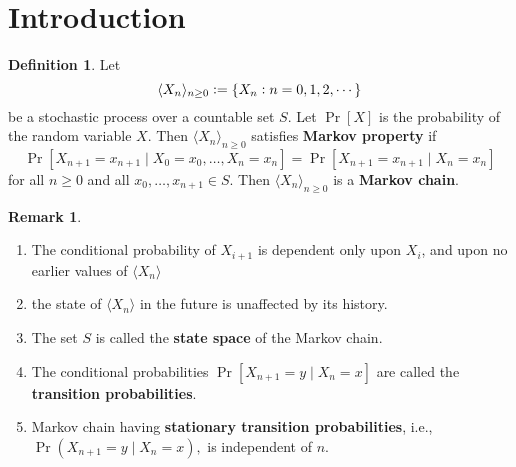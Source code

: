 \documentclass[12pt,openany]{book}
\theoremstyle{definition}
\newtheorem{definition}{Definition}[chapter]
\newtheorem{remark}{Remark}[chapter]
\newcommand{\ie}{\textnormal{i.e.}}
\newcommand{\markov}[1]{\langle #1\rangle}
\begin{document}
	\section{Introduction}
	\begin{tcolorbox}[colback=white,colframe=defcolor,arc=5pt,title={\color{white}\bf Markov Chain}]
		\begin{definition}
			Let $$
			\langle X_n\rangle_{n\geq 0}:=\set{X_n:n=0,1,2,\cdots}
			$$ be a stochastic process over a countable set $S$. Let $\Pr[X]$ is the probability of the random variable $X$. Then $\langle X_n\rangle_{n\geq 0}$ satisfies \textbf{Markov property} if \[
			\Pr[X_{n+1}=x_{n+1}\mid X_0=x_0,\dots,X_n=x_n]=\Pr[X_{n+1}=x_{n+1}\mid X_n=x_n]
			\] for all $n\geq 0$ and all $x_0,\dots, x_{n+1}\in S$. Then $\markov{X_n}_{n\geq 0}$ is a \textbf{Markov chain}.
		\end{definition}
	\end{tcolorbox}
	\begin{remark}
		\ \begin{enumerate}[(1)]
			\item The conditional probability of $X_{i+1}$ is dependent only upon $X_i$, and upon no earlier values of $\markov{X_n}$
			\item the state of $\markov{X_n}$ in the future is unaffected by its history.
			\item The set $S$ is called the \textbf{state space} of the Markov chain.
			\item The conditional probabilities $\Pr[X_{n+1}= y\mid X_n = x]$ are called the \textbf{transition probabilities}.
			\item Markov chain having \textbf{stationary transition probabilities}, \ie, $\Pr(X_{n+1}=y\mid X_n=x),$ is independent of $n$.
		\end{enumerate}
	\end{remark}
	\vspace{20pt}
	\newpage
\end{document}
